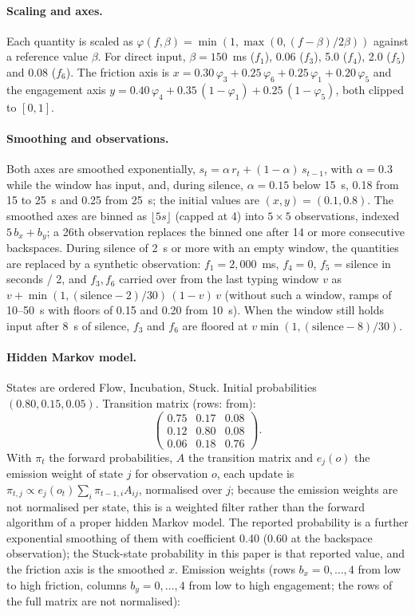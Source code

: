 \paragraph{Scaling and axes.} Each quantity is scaled as $\varphi(f, \beta) = \min(1, \max(0, (f - \beta) / 2\beta))$
against a reference value $\beta$. For direct input, $\beta = 150$~ms ($f_1$), 0.06 ($f_3$), 5.0 ($f_4$), 2.0 ($f_5$)
and 0.08 ($f_6$). The friction axis is $x = 0.30\,\varphi_3 + 0.25\,\varphi_6 + 0.25\,\varphi_1 + 0.20\,\varphi_5$ and
the engagement axis $y = 0.40\,\varphi_4 + 0.35\,(1 - \varphi_1) + 0.25\,(1 - \varphi_5)$, both clipped to $[0, 1]$.

\paragraph{Smoothing and observations.} Both axes are smoothed exponentially, $s_t = \alpha\,r_t + (1 - \alpha)\,s_{t-1}$,
with $\alpha = 0.3$ while the window has input, and, during silence, $\alpha = 0.15$ below 15~s, 0.18 from 15 to 25~s and
0.25 from 25~s; the initial values are $(x, y) = (0.1, 0.8)$. The smoothed axes are binned as
$\lfloor 5 s \rfloor$ (capped at 4) into $5 \times 5$ observations, indexed $5\,b_x + b_y$; a 26th observation replaces
the binned one after 14 or more consecutive backspaces. During silence of 2~s or more with an empty window, the
quantities are replaced by a synthetic observation: $f_1 = 2{,}000$~ms, $f_4 = 0$, $f_5$ = silence in seconds / 2, and
$f_3, f_6$ carried over from the last typing window $v$ as $v + \min(1, (\mathrm{silence} - 2)/30)\,(1 - v)\,v$ (without
such a window, ramps of 10--50~s with floors of 0.15 and 0.20 from 10~s). When the window still holds input after 8~s
of silence, $f_3$ and $f_6$ are floored at $v \min(1, (\mathrm{silence} - 8)/30)$.

\paragraph{Hidden Markov model.} States are ordered Flow, Incubation, Stuck. Initial probabilities $(0.80, 0.15, 0.05)$.
Transition matrix (rows: from):
\[
\begin{pmatrix} 0.75 & 0.17 & 0.08 \\ 0.12 & 0.80 & 0.08 \\ 0.06 & 0.18 & 0.76 \end{pmatrix}.
\]
With $\pi_t$ the forward probabilities, $A$ the transition matrix and $e_j(o)$ the emission weight of state $j$ for
observation $o$, each update is $\pi_{t,j} \propto e_j(o_t) \sum_i \pi_{t-1,i} A_{ij}$, normalised over $j$; because
the emission weights are not normalised per state, this is a weighted filter rather than the forward algorithm of a
proper hidden Markov model. The reported probability is a further exponential smoothing of
them with coefficient 0.40 (0.60 at the backspace observation); the Stuck-state probability in this paper is that
reported value, and the friction axis is the smoothed $x$. Emission weights (rows $b_x = 0, \ldots, 4$ from low to high
friction, columns $b_y = 0, \ldots, 4$ from low to high engagement; the rows of the full matrix are not normalised):

